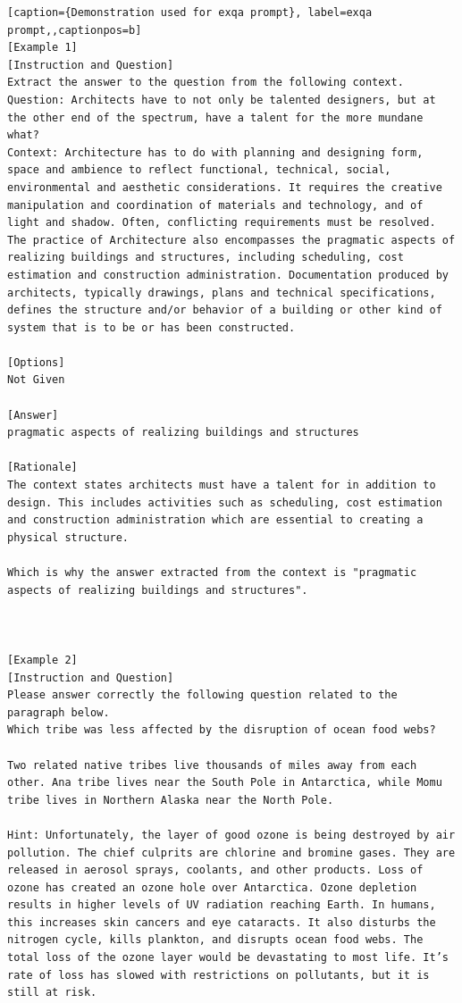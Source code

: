 \begin{lstlisting}[caption={Demonstration used for exqa prompt}, label=exqa prompt,,captionpos=b]
[Example 1]
[Instruction and Question]
Extract the answer to the question from the following context.
Question: Architects have to not only be talented designers, but at the other end of the spectrum, have a talent for the more mundane what?
Context: Architecture has to do with planning and designing form, space and ambience to reflect functional, technical, social, environmental and aesthetic considerations. It requires the creative manipulation and coordination of materials and technology, and of light and shadow. Often, conflicting requirements must be resolved. The practice of Architecture also encompasses the pragmatic aspects of realizing buildings and structures, including scheduling, cost estimation and construction administration. Documentation produced by architects, typically drawings, plans and technical specifications, defines the structure and/or behavior of a building or other kind of system that is to be or has been constructed.

[Options]
Not Given

[Answer]
pragmatic aspects of realizing buildings and structures

[Rationale]
The context states architects must have a talent for in addition to design. This includes activities such as scheduling, cost estimation and construction administration which are essential to creating a physical structure. 

Which is why the answer extracted from the context is "pragmatic aspects of realizing buildings and structures".



[Example 2]
[Instruction and Question]
Please answer correctly the following question related to the paragraph below. 
Which tribe was less affected by the disruption of ocean food webs?

Two related native tribes live thousands of miles away from each other. Ana tribe lives near the South Pole in Antarctica, while Momu tribe lives in Northern Alaska near the North Pole.

Hint: Unfortunately, the layer of good ozone is being destroyed by air pollution. The chief culprits are chlorine and bromine gases. They are released in aerosol sprays, coolants, and other products. Loss of ozone has created an ozone hole over Antarctica. Ozone depletion results in higher levels of UV radiation reaching Earth. In humans, this increases skin cancers and eye cataracts. It also disturbs the nitrogen cycle, kills plankton, and disrupts ocean food webs. The total loss of the ozone layer would be devastating to most life. It’s rate of loss has slowed with restrictions on pollutants, but it is still at risk.


\end{lstlisting}
